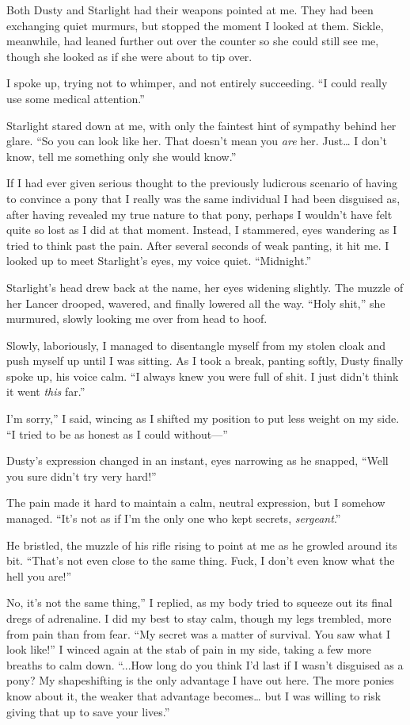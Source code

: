 Both Dusty and Starlight had their weapons pointed at me. They had been exchanging quiet murmurs, but stopped the moment I looked at them. Sickle, meanwhile, had leaned further out over the counter so she could still see me, though she looked as if she were about to tip over.

I spoke up, trying not to whimper, and not entirely succeeding. “I could really use some medical attention.”

Starlight stared down at me, with only the faintest hint of sympathy behind her glare. “So you can look like her. That doesn’t mean you \textit{are} her. Just… I don’t know, tell me something only she would know.”

If I had ever given serious thought to the previously ludicrous scenario of having to convince a pony that I really was the same individual I had been disguised as, after having revealed my true nature to that pony, perhaps I wouldn’t have felt quite so lost as I did at that moment. Instead, I stammered, eyes wandering as I tried to think past the pain. After several seconds of weak panting, it hit me. I looked up to meet Starlight’s eyes, my voice quiet. “Midnight.”

Starlight’s head drew back at the name, her eyes widening slightly. The muzzle of her Lancer drooped, wavered, and finally lowered all the way. “Holy shit,” she murmured, slowly looking me over from head to hoof.

Slowly, laboriously, I managed to disentangle myself from my stolen cloak and push myself up until I was sitting. As I took a break, panting softly, Dusty finally spoke up, his voice calm. “I always knew you were full of shit. I just didn’t think it went \textit{this} far.”

\leavevmode{}I’m sorry,” I said, wincing as I shifted my position to put less weight on my side. “I tried to be as honest as I could without—”

Dusty’s expression changed in an instant, eyes narrowing as he snapped, “Well you sure didn’t try very hard!”

The pain made it hard to maintain a calm, neutral expression, but I somehow managed. “It’s not as if I’m the only one who kept secrets, \textit{sergeant}.”

He bristled, the muzzle of his rifle rising to point at me as he growled around its bit. “That’s not even close to the same thing. Fuck, I don’t even know what the hell you are!”

\leavevmode{}No, it’s not the same thing,” I replied, as my body tried to squeeze out its final dregs of adrenaline. I did my best to stay calm, though my legs trembled, more from pain than from fear. “My secret was a matter of survival. You saw what I look like!” I winced again at the stab of pain in my side, taking a few more breaths to calm down. “...How long do you think I’d last if I wasn’t disguised as a pony? My shapeshifting is the only advantage I have out here. The more ponies know about it, the weaker that advantage becomes… but I was willing to risk giving that up to save your lives.”

